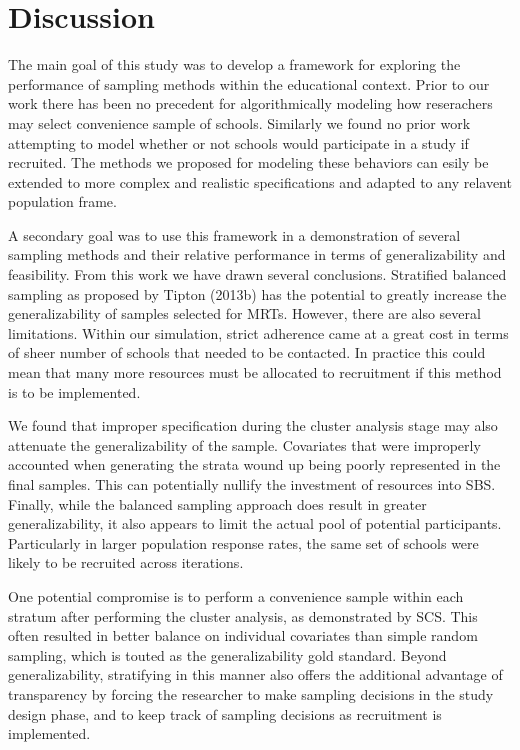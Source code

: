 \documentclass[man,floatsintext]{apa6}
\begin{document}
\hypertarget{discussion}{%
\section{Discussion}\label{discussion}}

The main goal of this study was to develop a framework for exploring the performance of sampling methods within the educational context. Prior to our work there has been no precedent for algorithmically modeling how reserachers may select convenience sample of schools. Similarly we found no prior work attempting to model whether or not schools would participate in a study if recruited. The methods we proposed for modeling these behaviors can esily be extended to more complex and realistic specifications and adapted to any relavent population frame.

A secondary goal was to use this framework in a demonstration of several sampling methods and their relative performance in terms of generalizability and feasibility. From this work we have drawn several conclusions. Stratified balanced sampling as proposed by Tipton (2013b) has the potential to greatly increase the generalizability of samples selected for MRTs. However, there are also several limitations. Within our simulation, strict adherence came at a great cost in terms of sheer number of schools that needed to be contacted. In practice this could mean that many more resources must be allocated to recruitment if this method is to be implemented.

We found that improper specification during the cluster analysis stage may also attenuate the generalizability of the sample. Covariates that were improperly accounted when generating the strata wound up being poorly represented in the final samples. This can potentially nullify the investment of resources into SBS. Finally, while the balanced sampling approach does result in greater generalizability, it also appears to limit the actual pool of potential participants. Particularly in larger population response rates, the same set of schools were likely to be recruited across iterations.

One potential compromise is to perform a convenience sample within each stratum after performing the cluster analysis, as demonstrated by SCS. This often resulted in better balance on individual covariates than simple random sampling, which is touted as the generalizability gold standard. Beyond generalizability, stratifying in this manner also offers the additional advantage of transparency by forcing the researcher to make sampling decisions in the study design phase, and to keep track of sampling decisions as recruitment is implemented.
\end{document}
